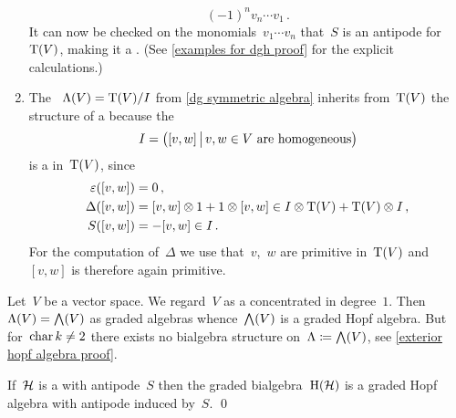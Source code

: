 \documentclass[a4paper,10pt,headings=standardclasses]{scrartcl}
\begin{document}
\begin{example}
\begin{enumerate}
\[        (-1)^n
        v_n \dotsm v_1  \,.
      \]%
      It can now be checked on the monomials~$v_1 \dotsm v_n$ that~$S$ is an antipode for~$\operatorname{T}(V)$, making it a {\dgh}.
      (See \cref{examples for dgh proof} for the explicit calculations.)
    \item
      The {\dga}~$\operatorname{\Lambda}(V) = \operatorname{T}(V)/I$ from \cref{dg symmetric algebra} inherits from~$\operatorname{T}(V)$ the structure of a {\dgh} because the~{\dgi}
      \[
        I
        =
        \bigl(
          [v,w]
        \suchthat[\big]
          \text{$v,w \in V$ are homogeneous}
        \bigr)
      \]
      is a {\dghi} in~$\operatorname{T}(V)$, since
      \begin{align*}
        \varepsilon([v,w])
        &=
        0 \,,
      \\
        \Delta([v,w])
        &=
        [v,w] \otimes 1 + 1 \otimes [v,w]
        \in
        I \otimes \operatorname{T}(V) + \operatorname{T}(V) \otimes I \,,
      \\
        S([v,w])
        &=
        -[v,w]
        \in
        I \,.
      \end{align*}
      For the computation of~$\Delta$ we use that~$v$,~$w$ are primitive in~$\operatorname{T}(V)$ and~$[v,w]$ is therefore again primitive.
  \end{enumerate}
\end{example}

\begin{example}
  \label{exterior hopf algebra}
  Let~$V$ be a vector space.
  We regard~$V$ as a {\dgv} concentrated in degree~$1$.
  Then~$\operatorname{\Lambda}(V) = \bigwedge(V)$ as graded algebras whence~$\bigwedge(V)$ is a graded Hopf algebra.
  But for~$\operatorname{char} k \neq 2$ there exists no bialgebra structure on~$\Lambda \coloneqq \bigwedge(V)$, see \cref{exterior hopf algebra proof}.
\end{example}

\begin{proposition}
  If~$\mathcal{H}$ is a {\dgh} with antipode~$S$ then the graded bialgebra~$\operatorname{H}(\mathcal{H})$ is a graded Hopf algebra with antipode induced by~$S$.
  \qed
\end{proposition}
\end{document}
